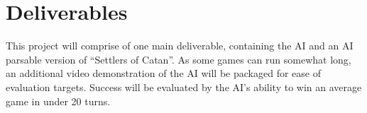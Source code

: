 \documentclass[]{article}
\begin{document}
    \section{Deliverables}

    This project will comprise of one main deliverable, containing the AI and an AI parsable version of ``Settlers of Catan''.
    As some games can run somewhat long, an additional video demonstration of the AI will be packaged for ease of evaluation targets.
    Success will be evaluated by the AI's ability to win an average game in under 20 turns.
    
\end{document}
